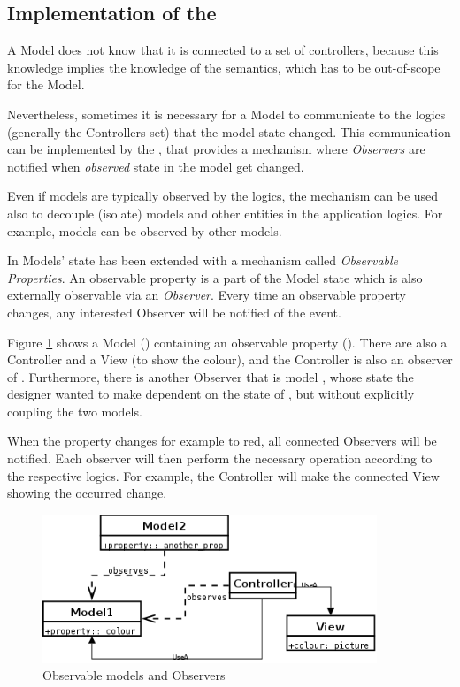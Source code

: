 \subsection{\label{OBS} Implementation of the \obs}

A Model does not know that it is connected to a set of controllers,
because this knowledge implies the knowledge of the \gui semantics,
which has to be out-of-scope for the Model.

Nevertheless, sometimes it is necessary for a Model to communicate to
the \gui logics (generally the Controllers set) that the model state
changed. This communication can be implemented by the \obs, that
provides a mechanism where \emph{Observers} are notified when
\emph{observed} state in the model get changed.

Even if models are typically observed by the \gui logics, the
mechanism can be used also to decouple (isolate) models and other
entities in the application logics. For example, models can be
observed by other models.

In \pygtkmvc Models' state has been extended with a mechanism called
\emph{Observable Properties}. An observable property is a part of the
Model state which is also externally observable via an
\emph{Observer}. Every time an observable property changes, any
interested Observer will be notified of the event.

Figure \ref{F:OBS} shows a Model () containing an
observable property (). There are also a Controller and a
View (to show the colour), and the Controller is also an observer of
. Furthermore, there is another Observer that is model 
, whose state the designer wanted to make dependent on the
state of , but without explicitly coupling the two models.

When the property  changes for example to red, all connected
Observers will be notified. Each observer will then perform the
necessary operation according to the respective logics. For example,
the Controller will make the connected View showing the occurred
change.

\begin{figure}[htbp]
\begin{center}
\includegraphics[width=10cm]{figs/png/obs}
\caption{\label{F:OBS}Observable models and Observers}
\end{center}
\end{figure}

